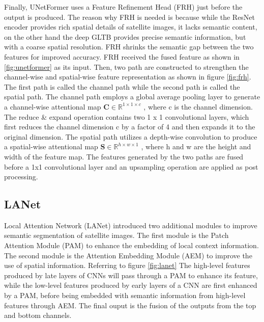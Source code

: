 Finally, UNetFormer uses a Feature Refinement Head (FRH) just before the output is produced. The reason why FRH is needed is because while the ResNet encoder provides rich spatial details of satellite images, it lacks semantic content, on the other hand the deep GLTB provides precise semantic information, but with a coarse spatial resolution. FRH shrinks the semantic gap between the two features for improved accuracy. FRH received the fused feature as shown in \ref{fig:unetformer} as its input. Then, two path are constructed to strengthen the channel-wise and spatial-wise feature representation as shown in figure \ref{fig:frh}. The first path is called the channel path while the second path is called the spatial path. The channel path employs a global average pooling layer to generate a channel-wise attentional map $\textbf{C} \in \mathbb{R}^{1\times 1 \times c}$ , where c is the channel dimension. The reduce \& expand operation contains two 1 x 1 convolutional layers, which first reduces the channel dimension c by a factor of 4 and then expands it to the original dimension. The spatial path utilizes a depth-wise convolution to produce a spatial-wise attentional map $\textbf{S} \in \mathbb{R}^{h\times w \times 1}$  , where h and w are the height and width of the feature map. The features generated by the two paths are fused before a 1x1 convolutional layer and an upsampling operation are applied as post processing.

\subsection{LANet}
Local Attention Network (LANet) \cite{lanet}introduced two additional modules to improve semantic segmentation of satellite images. The first module is the Patch Attention Module (PAM) to enhance the embedding of local context information. The second module is the Attention Embedding Module (AEM) to improve the use of spatial information. Referring to figure \ref{fig:lanet} The high-level features produced by late layers of CNNs will pass through a PAM to enhance its feature, while the low-level features produced by early layers of a CNN are first enhanced by a PAM, before being embedded with semantic information from high-level features through AEM. The final ouput is the fusion of the outputs from the top and bottom channels. 

